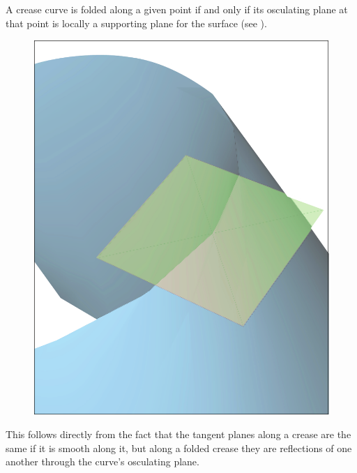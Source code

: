 \begin{theorem}\label{Thm:supporting_plane}
A crease curve is folded along a given point if and only if its osculating plane at that point is locally a supporting plane for the surface (see ).
\end{theorem}

\begin{figure} [h]
	\centering
	\includegraphics[width=0.5\linewidth]{figures/plane_side}
	\caption{}
	\label{fig:plane_side}
\end{figure}

This follows directly from the fact that the tangent planes along a crease are the same if it is smooth along it, but along a folded crease they are reflections of one another through the curve's osculating plane. %




